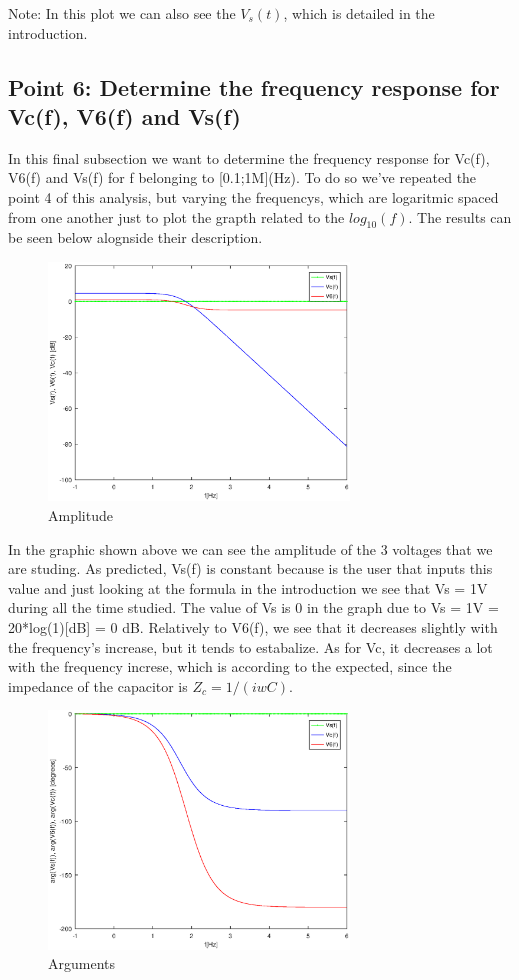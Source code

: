 Note: In this plot we can also see the $V_s(t)$, which is detailed in the introduction.

\subsection{Point 6: Determine the frequency response for Vc(f), V6(f) and Vs(f)}

In this final subsection we want to determine the frequency response for Vc(f), V6(f) and Vs(f) for f belonging to [0.1;1M](Hz). To do so we've repeated the point 4 of this analysis, but varying the frequencys, which are logaritmic spaced from one another just to plot the grapth related to the $log_{10}(f)$. The results can be seen below alognside their description.

\begin{figure}[H]
\centering
\includegraphics[width = 8cm]{Amplitude.eps}
\caption {Amplitude}
\end{figure}

In the graphic shown above we can see the amplitude of the 3 voltages that we are studing. As predicted, Vs(f) is constant because is the user that inputs this value and just looking at the formula in the introduction we see that Vs = 1V during all the time studied. The value of Vs is 0 in the graph due to Vs = 1V = 20*log(1)[dB] = 0 dB. Relatively to V6(f), we see that it decreases slightly with the frequency's increase, but it tends to estabalize. As for Vc, it decreases a lot with the frequency increse, which is according to the expected, since the impedance of the capacitor is $Z_c = 1/(iwC)$.

\begin{figure}[H]
\centering
\includegraphics[width = 8cm]{Arguments.eps}
\caption {Arguments}
\end{figure}

